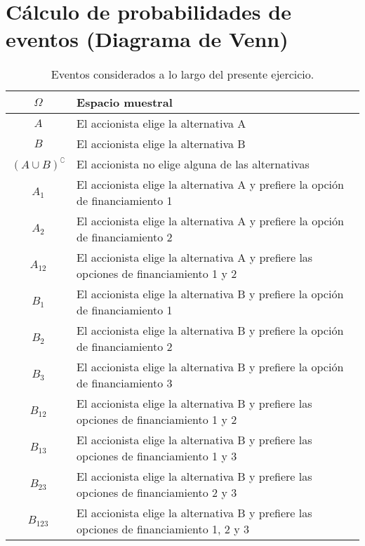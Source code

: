 \documentclass[paper=letterpaper]{article}
\begin{document}
\section{Cálculo de probabilidades de eventos (Diagrama de Venn)}

\begin{table}[!htbp]
\centering
\begin{tabular}{|c|p{12cm}|}
\hline
$\Omega$ & Espacio muestral \\ \hline
$A$ & El accionista elige la alternativa A \\ \hline
$B$ & El accionista elige la alternativa B \\ \hline
$(A \cup B)^{\complement}$ & El accionista no elige alguna de las alternativas \\ \hline
$A_1$ & El accionista elige la alternativa A y prefiere la opción de financiamiento 1 \\ \hline
$A_2$ & El accionista elige la alternativa A y prefiere la opción de financiamiento 2 \\ \hline
$A_{12}$ & El accionista elige la alternativa A y prefiere las opciones de financiamiento 1 y 2 \\ \hline
$B_1$ & El accionista elige la alternativa B y prefiere la opción de financiamiento 1 \\ \hline
$B_2$ & El accionista elige la alternativa B y prefiere la opción de financiamiento 2 \\ \hline
$B_3$ & El accionista elige la alternativa B y prefiere la opción de financiamiento 3 \\ \hline
$B_{12}$ & El accionista elige la alternativa B y prefiere las opciones de financiamiento 1 y 2 \\ \hline
$B_{13}$ & El accionista elige la alternativa B y prefiere las opciones de financiamiento 1 y 3 \\ \hline
$B_{23}$ & El accionista elige la alternativa B y prefiere las opciones de financiamiento 2 y 3 \\ \hline
$B_{123}$ & El accionista elige la alternativa B y prefiere las opciones de financiamiento 1, 2 y 3 \\ \hline
\end{tabular}
\caption{Eventos considerados a lo largo del presente ejercicio.}
\label{Tab:T1}
\end{table}
\end{document}
